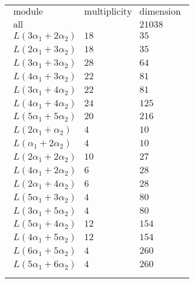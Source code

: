 \documentclass[crop,border=2mm]{standalone}
\begin{document}
\begin{tabular}{l}
$\displaystyle
\begin{array}{rll}
	\text{module}&\text{multiplicity}&\text{dimension} \\ \hline \text{all}&&21038 \\
	L\left( 3\alpha_{1}+ 2\alpha_{2}\right)&18&35\\
	L\left( 2\alpha_{1}+ 3\alpha_{2}\right)&18&35\\
	L\left( 3\alpha_{1}+ 3\alpha_{2}\right)&28&64\\
	L\left( 4\alpha_{1}+ 3\alpha_{2}\right)&22&81\\
	L\left( 3\alpha_{1}+ 4\alpha_{2}\right)&22&81\\
	L\left( 4\alpha_{1}+ 4\alpha_{2}\right)&24&125\\
	L\left( 5\alpha_{1}+ 5\alpha_{2}\right)&20&216\\
	L\left( 2\alpha_{1}+\alpha_{2}\right)&4&10\\
	L\left(\alpha_{1}+ 2\alpha_{2}\right)&4&10\\
	L\left( 2\alpha_{1}+ 2\alpha_{2}\right)&10&27\\
	L\left( 4\alpha_{1}+ 2\alpha_{2}\right)&6&28\\
	L\left( 2\alpha_{1}+ 4\alpha_{2}\right)&6&28\\
	L\left( 5\alpha_{1}+ 3\alpha_{2}\right)&4&80\\
	L\left( 3\alpha_{1}+ 5\alpha_{2}\right)&4&80\\
	L\left( 5\alpha_{1}+ 4\alpha_{2}\right)&12&154\\
	L\left( 4\alpha_{1}+ 5\alpha_{2}\right)&12&154\\
	L\left( 6\alpha_{1}+ 5\alpha_{2}\right)&4&260\\
	L\left( 5\alpha_{1}+ 6\alpha_{2}\right)&4&260
\end{array}
$ \\ \\

\end{tabular}
\end{document}
